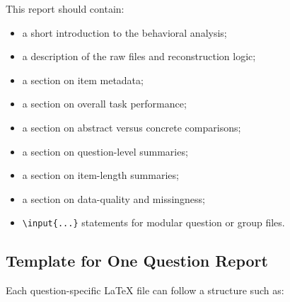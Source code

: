 This report should contain:
\begin{itemize}
    \item a short introduction to the behavioral analysis;
    \item a description of the raw files and reconstruction logic;
    \item a section on item metadata;
    \item a section on overall task performance;
    \item a section on abstract versus concrete comparisons;
    \item a section on question-level summaries;
    \item a section on item-length summaries;
    \item a section on data-quality and missingness;
    \item \texttt{\textbackslash input\{...\}} statements for modular question or group files.
\end{itemize}

\subsection{Template for One Question Report}
Each question-specific \LaTeX{} file can follow a structure such as:

